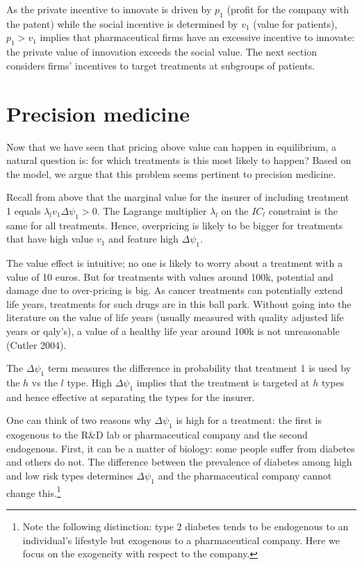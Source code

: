 \documentclass[a4paper,12pt]{article}
\makeatletter
\newcommand{\citeprocitem}[2]{\hyper@linkstart{cite}{citeproc_bib_item_#1}#2\hyper@linkend}
\makeatother
\begin{document}
As the private incentive to innovate is driven by \(p_1\) (profit for the company with the patent) while the social incentive is determined by \(v_1\) (value for patients), \(p_1>v_1\) implies that pharmaceutical firms have an excessive incentive to innovate: the private value of innovation exceeds the social value. The next section considers firms' incentives to target treatments at subgroups of patients.



\section{Precision medicine}
\label{sec:org80d77ad}

Now that we have seen that pricing above value can happen in equilibrium, a natural question is: for which treatments is this most likely to happen? Based on the model, we argue that this problem seems pertinent to precision medicine.

Recall from above that the marginal value for the insurer of including treatment 1 equals \(\lambda_l v_1 \Delta \psi_1 >0\). The Lagrange multiplier \(\lambda_l\) on the \(IC_l\) constraint is the same for all treatments. Hence, overpricing is likely to be bigger for treatments that have high value \(v_1\) and feature high \(\Delta \psi_1\).

The value effect is intuitive; no one is likely to worry about a treatment with a value of 10 euros. But for treatments with values around 100k, potential and damage due to over-pricing is big. As cancer treatments can potentially extend life years, treatments for such drugs are in this ball park. Without going into the literature on the value of life years (usually measured with quality adjusted life years or qaly's), a value of a healthy life year around 100k is not unreasonable (\citeprocitem{9}{Cutler 2004}).

The \(\Delta \psi_1\) term measures the difference in probability that treatment 1 is used by the \(h\) vs the \(l\) type. High \(\Delta \psi_1\) implies that the treatment is targeted at \(h\) types and hence effective at separating the types for the insurer.


One can think of two reasons why \(\Delta \psi_1\) is high for a treatment: the first is exogenous to the R\&D lab or pharmaceutical company and the second endogenous. First, it can be a matter of biology: some people suffer from diabetes and others do not. The difference between the prevalence of diabetes among high and low risk types determines \(\Delta \psi_1\) and the pharmaceutical company cannot change this.\footnote{Note the following distinction: type 2 diabetes tends to be endogenous to an individual's lifestyle but exogenous to a pharmaceutical company. Here we focus on the exogeneity with respect to the company.}
\end{document}
